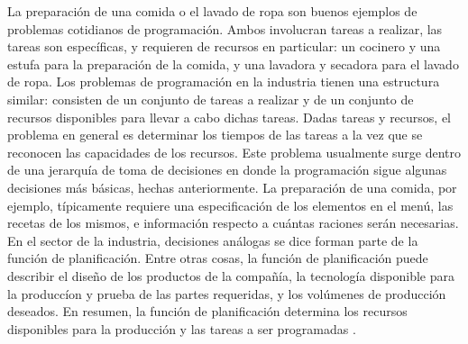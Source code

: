 \documentclass[draft,12pt,headsepline,footsepline,paper=letter]{scrreprt}
\begin{document}
La preparación de una comida o el lavado de ropa son buenos ejemplos de problemas cotidianos de programación. Ambos involucran tareas a realizar, las tareas son específicas, y requieren de recursos en particular: un cocinero y una estufa para la preparación de la comida, y una lavadora y secadora para el lavado de ropa.
Los problemas de programación en la industria tienen una estructura similar: consisten de un conjunto de tareas a realizar y de un conjunto de recursos disponibles para llevar a cabo dichas tareas. Dadas tareas y recursos, el problema en general es determinar los tiempos de las tareas a la vez que se reconocen las capacidades de los recursos.
Este problema usualmente surge dentro de una jerarquía de toma de decisiones en donde la programación sigue algunas decisiones más básicas, hechas anteriormente. La preparación de una comida, por ejemplo, típicamente requiere una especificación de los elementos en el menú, las recetas de los mismos, e información respecto a cuántas raciones serán necesarias. En el sector de la industria, decisiones análogas se dice forman parte de la función de planificación. Entre otras cosas, la función de planificación puede describir el diseño de los productos de la compañía, la tecnología disponible para la produccíon y prueba de las partes requeridas, y los volúmenes de producción deseados. En resumen, la función de planificación determina los recursos disponibles para la producción y las tareas a ser programadas \citep[p.~2]{Baker2009}.
\end{document}
